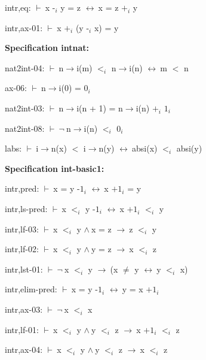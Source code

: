 \documentclass[a4paper]{article}
\newcommand{\Fol}{\mbox{$\vdash\ $}}
\newcommand{\Not}{\mbox{$\neg\ $}}
\newcommand{\And}{\mbox{$\wedge\ $}}
\newcommand{\Imp}{\mbox{$\rightarrow\ $}}
\newcommand{\Equiv}{\mbox{$\leftrightarrow\ $}}
\begin{document}
intr,eq: 
 \Fol x $\mbox{-}_{i}$ y = z \Equiv x = z $\mbox{+}_{i}$ y



intr,ax-01: 
 \Fol x $\mbox{+}_{i}$ (y $\mbox{-}_{i}$ x) = y



{\bf Specification intnat:}

nat2int-04: 
 \Fol n$\to$i(m) $\mbox{$<$}_{i}$ n$\to$i(n) \Equiv m $<$ n



ax-06: 
 \Fol n$\to$i(0) = $\mbox{0}_{i}$



nat2int-03: 
 \Fol n$\to$i(n + 1) = n$\to$i(n) $\mbox{+}_{i}$ $\mbox{1}_{i}$



nat2int-08: 
 \Fol \Not n$\to$i(n) $\mbox{$<$}_{i}$ $\mbox{0}_{i}$



labs: 
 \Fol i$\to$n(x) $<$ i$\to$n(y) \Equiv absi(x) $\mbox{$<$}_{i}$ absi(y)



{\bf Specification int-basic1:}

intr,pred: 
 \Fol x = y $\mbox{-1}_{i}$ \Equiv x $\mbox{+1}_{i}$ = y



intr,ls-pred: 
 \Fol x $\mbox{$<$}_{i}$ y $\mbox{-1}_{i}$ \Equiv x $\mbox{+1}_{i}$ $\mbox{$<$}_{i}$ y



intr,lf-03: 
 \Fol x $\mbox{$<$}_{i}$ y \And x = z \Imp z $\mbox{$<$}_{i}$ y



intr,lf-02: 
 \Fol x $\mbox{$<$}_{i}$ y \And y = z \Imp x $\mbox{$<$}_{i}$ z



intr,lst-01: 
 \Fol \Not x $\mbox{$<$}_{i}$ y \Imp (x $\neq$ y \Equiv y $\mbox{$<$}_{i}$ x)



intr,elim-pred: 
 \Fol x = y $\mbox{-1}_{i}$ \Equiv y = x $\mbox{+1}_{i}$



intr,ax-03: 
 \Fol \Not x $\mbox{$<$}_{i}$ x



intr,lf-01: 
 \Fol x $\mbox{$<$}_{i}$ y \And y $\mbox{$<$}_{i}$ z \Imp x $\mbox{+1}_{i}$ $\mbox{$<$}_{i}$ z



intr,ax-04: 
 \Fol x $\mbox{$<$}_{i}$ y \And y $\mbox{$<$}_{i}$ z \Imp x $\mbox{$<$}_{i}$ z
\end{document}
